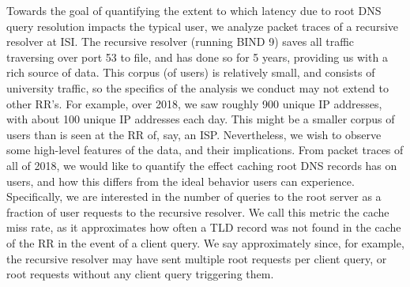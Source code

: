 \documentclass[sigconf,nonacm,10pt]{acmart}
\begin{document}
Towards the goal of quantifying the extent to which latency due to root
DNS query resolution impacts the typical user, we analyze packet traces
of a recursive resolver at ISI. The recursive resolver (running BIND 9)
saves all traffic traversing over port 53 to file, and has done so for 5
years, providing us with a rich source of data. This corpus (of users)
is relatively small, and consists of university traffic, so the
specifics of the analysis we conduct may not extend to other RR's. For
example, over 2018, we saw roughly 900 unique IP addresses, with about
100 unique IP addresses each day. This might be a smaller corpus of
users than is seen at the RR of, say, an ISP. Nevertheless, we wish to
observe some high-level features of the data, and their implications.
From packet traces of all of 2018, we would like to quantify the effect
caching root DNS records has on users, and how this differs from the
ideal behavior users can experience. Specifically, we are interested in
the number of queries to the root server as a fraction of user requests
to the recursive resolver. We call this metric the cache miss rate, as
it approximates how often a TLD record was not found in the cache of the
RR in the event of a client query. We say approximately since, for
example, the recursive resolver may have sent multiple root requests per
client query, or root requests without any client query triggering them.
\end{document}
